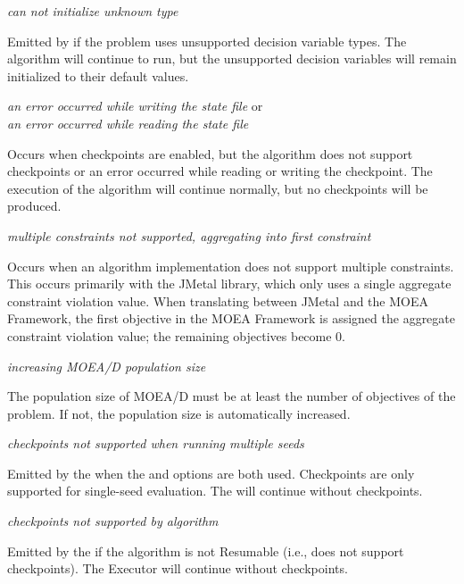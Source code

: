\noindent
\textit{can not initialize unknown type}
\begin{indented}
  Emitted by  if the problem uses unsupported decision variable types.  The algorithm will continue to run, but the unsupported decision variables will remain initialized to their default values.
\end{indented}

\noindent
\textit{an error occurred while writing the state file} or\\
\textit{an error occurred while reading the state file}
\begin{indented}
  Occurs when checkpoints are enabled, but the algorithm does not support checkpoints or an error occurred while reading or writing the checkpoint.  The execution of the algorithm will continue normally, but no checkpoints will be produced.
\end{indented}
  
\noindent
\textit{multiple constraints not supported, aggregating into first constraint}
\begin{indented}
  Occurs when an algorithm implementation does not support multiple constraints. This occurs primarily with the JMetal library, which only uses a single aggregate constraint violation value.  When translating between JMetal and the MOEA Framework, the first objective in the MOEA Framework is assigned the aggregate constraint violation value; the remaining objectives become 0.
\end{indented}

\noindent
\textit{increasing MOEA/D population size}
\begin{indented}
  The population size of MOEA/D must be at least the number of objectives of the problem.  If not, the population size is automatically increased.
\end{indented}
  
\noindent
\textit{checkpoints not supported when running multiple seeds}
\begin{indented}
  Emitted by the  when the  and  options are both used.  Checkpoints are only supported for single-seed evaluation.  The  will continue without checkpoints.
\end{indented}
  
\noindent
\textit{checkpoints not supported by algorithm}
\begin{indented}
  Emitted by the  if the algorithm is not Resumable (i.e., does not support checkpoints).  The Executor will continue without checkpoints.
\end{indented}
  
